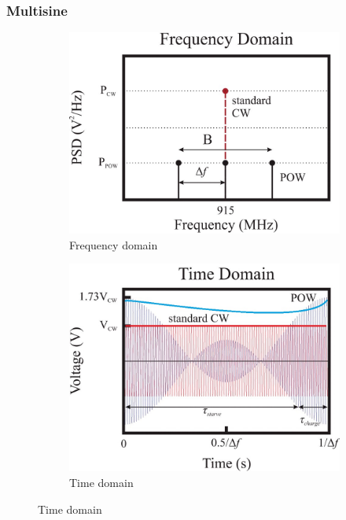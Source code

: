 \documentclass{beamer}
\begin{document}
\begin{frame}
\frametitle{Multisine}

\begin{figure}
  \centering

  \begin{subfigure}{.35\textwidth}
    \centering
      \includegraphics[width=\textwidth]{waveform_frequency_domain}
    \caption{Frequency domain}
    \label{fig:waveform_frequency_domain}
  \end{subfigure}
  \begin{subfigure}{.35\textwidth}
    \centering
      \includegraphics[width=\textwidth]{waveform_time_domain}
    \caption{Time domain}
    \label{fig:waveform_time_domain}
  \end{subfigure}


\end{figure}
\end{frame}
\end{document}
